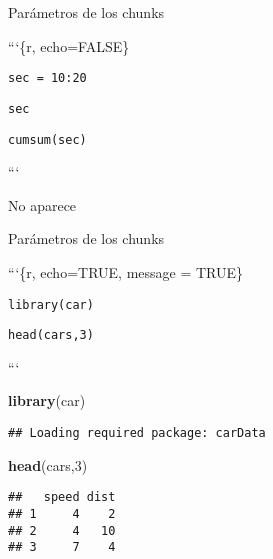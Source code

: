 \documentclass[ignorenonframetext,]{beamer}
\newenvironment{Shaded}{\begin{snugshade}}{\end{snugshade}}
\newcommand{\DecValTok}[1]{\textcolor[rgb]{0.00,0.00,0.81}{#1}}
\newcommand{\KeywordTok}[1]{\textcolor[rgb]{0.13,0.29,0.53}{\textbf{#1}}}
\newcommand{\NormalTok}[1]{#1}
\begin{document}
\begin{frame}[fragile]{Parámetros de los chunks}
\protect\hypertarget{parametros-de-los-chunks-2}{}

```\{r, echo=FALSE\}

\texttt{sec\ =\ 10:20}

\texttt{sec}

\texttt{cumsum(sec)}

```

\n

No aparece

\end{frame}

\begin{frame}[fragile]{Parámetros de los chunks}
\protect\hypertarget{parametros-de-los-chunks-3}{}

```\{r, echo=TRUE, message = TRUE\}

\texttt{library(car)}

\texttt{head(cars,3)}

```

\n

\begin{Shaded}
\begin{Highlighting}[]
\KeywordTok{library}\NormalTok{(car)}
\end{Highlighting}
\end{Shaded}

\begin{verbatim}
## Loading required package: carData
\end{verbatim}

\begin{Shaded}
\begin{Highlighting}[]
\KeywordTok{head}\NormalTok{(cars,}\DecValTok{3}\NormalTok{)}
\end{Highlighting}
\end{Shaded}

\begin{verbatim}
##   speed dist
## 1     4    2
## 2     4   10
## 3     7    4
\end{verbatim}

\end{frame}
\end{document}
